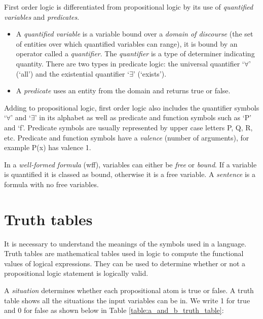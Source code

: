 \documentclass{report}
\begin{document}
First order logic is differentiated from propositional logic by its use of \textit{quantified variables} and \textit{predicates}. 

\begin{itemize}
\item A \textit{quantified variable} is a variable bound over a \textit{domain of discourse} (the set of entities over which quantified variables can range), it is bound by an operator called a \textit{quantifier}. The \textit{quantifier} is a type of determiner indicating quantity. There are two types in predicate logic: the universal quantifier `$\forall$' (`all') and the existential quantifier `$\exists$' (`exists').
\item A \textit{predicate} uses an entity from the domain and returns true or false. 
\end{itemize}

Adding to propositional logic, first order logic also includes the quantifier symbols `$\forall$' and `$\exists$' in its alphabet as well as predicate and function symbols such as `P' and `f'. Predicate symbols are usually represented by upper case letters P, Q, R, etc. Predicate and function symbols have a \textit{valence} (number of arguments), for example P(x) has valence 1.

In a \emph{well-formed formula} (wff), variables can either be \emph{free} or \emph{bound}. If a variable is quantified it is classed as bound, otherwise it is a free variable. A \emph{sentence} is a formula with no free variables.

\section{Truth tables}
\label{sec:truth_tables}

It is necessary to understand the meanings of the symbols used in a language. Truth tables are mathematical tables used in logic to compute the functional values of logical expressions. They can be used to determine whether or not a propositional logic statement is logically valid.

A \textit{situation} determines whether each propositional atom is true or false. A truth table shows all the situations the input variables can be in. We write 1 for true and 0 for false as shown below in Table \ref{table:a_and_b_truth_table}:
\end{document}
